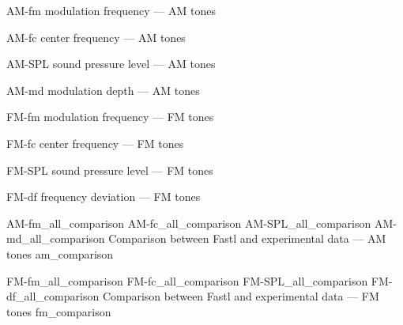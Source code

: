 \documentclass[../main.tex]{subfiles}
\begin{document}
\begin{experimentalresults}

\myfigurefastlexpstds%
  {AM-fm}
  {modulation frequency --- AM tones}

\myfigurefastlexpstds%
  {AM-fc}
  {center frequency --- AM tones}

\myfigurefastlexpstds%
  {AM-SPL}
  {sound pressure level --- AM tones}

\myfigurefastlexpstds%
  {AM-md}
  {modulation depth --- AM tones}

\myfigurefastlexpstds%
  {FM-fm}
  {modulation frequency --- FM tones}

\myfigurefastlexpstds%
  {FM-fc}
  {center frequency --- FM tones}

\myfigurefastlexpstds%
  {FM-SPL}
  {sound pressure level --- FM tones}

\myfigurefastlexpstds%
  {FM-df}
  {frequency deviation --- FM tones}

\myfigurequadlabeled%
  {AM-fm_all_comparison}
  {AM-fc_all_comparison}
  {AM-SPL_all_comparison}
  {AM-md_all_comparison}
  {Comparison between Fastl and experimental data --- AM tones}
  {am_comparison}

\myfigurequadlabeled%
  {FM-fm_all_comparison}
  {FM-fc_all_comparison}
  {FM-SPL_all_comparison}
  {FM-df_all_comparison}
  {Comparison between Fastl and experimental data --- FM tones}
  {fm_comparison}

\end{experimentalresults}
\end{document}
